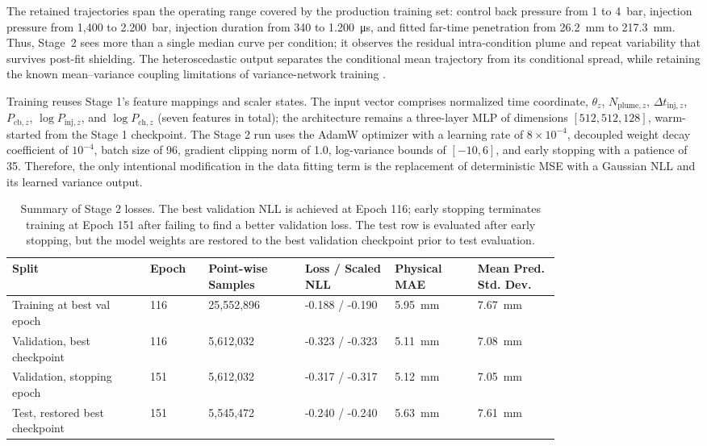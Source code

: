 The retained trajectories span the operating range covered by the production training set: control back pressure from 1 to \SI{4}{bar}, injection pressure from 1,400 to \SI{2,200}{bar}, injection duration from 340 to \SI{1,200}{\micro s}, and fitted far-time penetration from \SI{26.2}{mm} to \SI{217.3}{mm}. Thus, Stage~2 sees more than a single median curve per condition; it observes the residual intra-condition plume and repeat variability that survives post-fit shielding. The heteroscedastic output separates the conditional mean trajectory from its conditional spread, while retaining the known mean--variance coupling limitations of variance-network training \cite{Detlefsen2019VarianceNetworks,Seitzer2022PitfallsHeteroscedastic}.

Training reuses Stage 1's feature mappings and scaler states. The input vector comprises normalized time coordinate, \(\theta_z\), \(N_{\mathrm{plume},z}\), \(\Delta t_{\mathrm{inj},z}\), \(P_{\mathrm{cb},z}\), \(\log P_{\mathrm{inj},z}\), and \(\log P_{\mathrm{ch},z}\) (seven features in total); the architecture remains a three-layer MLP of dimensions $[512,512,128]$, warm-started from the Stage 1 checkpoint. The Stage 2 run uses the AdamW optimizer with a learning rate of \(8\times10^{-4}\), decoupled weight decay coefficient of \(10^{-4}\), batch size of 96, gradient clipping norm of 1.0, log-variance bounds of \([-10,6]\), and early stopping with a patience of 35. Therefore, the only intentional modification in the data fitting term is the replacement of deterministic MSE with a Gaussian NLL and its learned variance output.

\begin{table}[!ht]
\centering
\footnotesize
\setlength{\tabcolsep}{3pt}
\begin{tabular}{|L{0.20\linewidth}|L{0.08\linewidth}|L{0.14\linewidth}|L{0.13\linewidth}|L{0.12\linewidth}|L{0.12\linewidth}|}
\hline
Split & Epoch & Point-wise Samples & Loss / Scaled NLL & Physical MAE & Mean Pred. Std. Dev. \\
\hline
Training at best val epoch & 116 & 25{,}552{,}896 & -0.188 / -0.190 & \SI{5.95}{mm} & \SI{7.67}{mm} \\
Validation, best checkpoint & 116 & 5{,}612{,}032 & -0.323 / -0.323 & \SI{5.11}{mm} & \SI{7.08}{mm} \\
Validation, stopping epoch & 151 & 5{,}612{,}032 & -0.317 / -0.317 & \SI{5.12}{mm} & \SI{7.05}{mm} \\
Test, restored best checkpoint & 151 & 5{,}545{,}472 & -0.240 / -0.240 & \SI{5.63}{mm} & \SI{7.61}{mm} \\
\hline
\end{tabular}
\caption{Summary of Stage 2 losses. The best validation NLL is achieved at Epoch 116; early stopping terminates training at Epoch 151 after failing to find a better validation loss. The test row is evaluated after early stopping, but the model weights are restored to the best validation checkpoint prior to test evaluation.}
\label{tab:stage2-epoch-loss}
\end{table}

